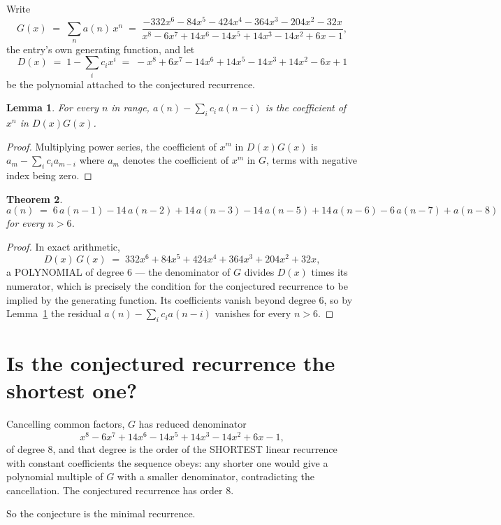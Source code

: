 \documentclass[11pt,a4paper]{article}
\theoremstyle{plain}
\newtheorem{theorem}{Theorem}
\newtheorem{lemma}[theorem]{Lemma}
\theoremstyle{definition}
\begin{document}
Write
\[
G(x)\;=\;\sum_{n}a(n)\,x^{n}\;=\;\frac{- 332 x^{6} - 84 x^{5} - 424 x^{4} - 364 x^{3} - 204 x^{2} - 32 x}{x^{8} - 6 x^{7} + 14 x^{6} - 14 x^{5} + 14 x^{3} - 14 x^{2} + 6 x - 1},
\]
the entry's own generating function, and let
\[
D(x)\;=\;1-\sum_i c_i x^{i}\;=\;- x^{8} + 6 x^{7} - 14 x^{6} + 14 x^{5} - 14 x^{3} + 14 x^{2} - 6 x + 1
\]
be the polynomial attached to the conjectured recurrence.

\begin{lemma}\label{lem:key}
For every $n$ in range, $a(n)-\sum_i c_i\,a(n-i)$ is the coefficient of $x^{n}$ in
$D(x)G(x)$.
\end{lemma}

\begin{proof}
Multiplying power series, the coefficient of $x^{m}$ in $D(x)G(x)$ is
$a_m-\sum_i c_i a_{m-i}$ where $a_m$ denotes the coefficient of $x^{m}$ in $G$, terms with
negative index being zero.
\end{proof}

\begin{theorem}
\[
a(n)\;=\;6\,a(n-1) - 14\,a(n-2) + 14\,a(n-3) - 14\,a(n-5) + 14\,a(n-6) - 6\,a(n-7) + a(n-8)
\]
for every $n>6$.
\end{theorem}

\begin{proof}
In exact arithmetic,
\[
D(x)\,G(x)\;=\;332 x^{6} + 84 x^{5} + 424 x^{4} + 364 x^{3} + 204 x^{2} + 32 x,
\]
a POLYNOMIAL of degree $6$ --- the denominator of $G$ divides $D(x)$ times its numerator,
which is precisely the condition for the conjectured recurrence to be implied by the
generating function. Its coefficients vanish beyond degree $6$, so by
Lemma~\ref{lem:key} the residual $a(n)-\sum_ic_ia(n-i)$ vanishes for every
$n>6$.
\end{proof}

\section{Is the conjectured recurrence the shortest one?}

Cancelling common factors, $G$ has reduced denominator
\[
x^{8} - 6 x^{7} + 14 x^{6} - 14 x^{5} + 14 x^{3} - 14 x^{2} + 6 x - 1,
\]
of degree $8$, and that degree is the order of the SHORTEST linear recurrence with
constant coefficients the sequence obeys: any shorter one would give a polynomial multiple of
$G$ with a smaller denominator, contradicting the cancellation. The conjectured recurrence has
order $8$.

So the conjecture is the minimal recurrence.
\end{document}
